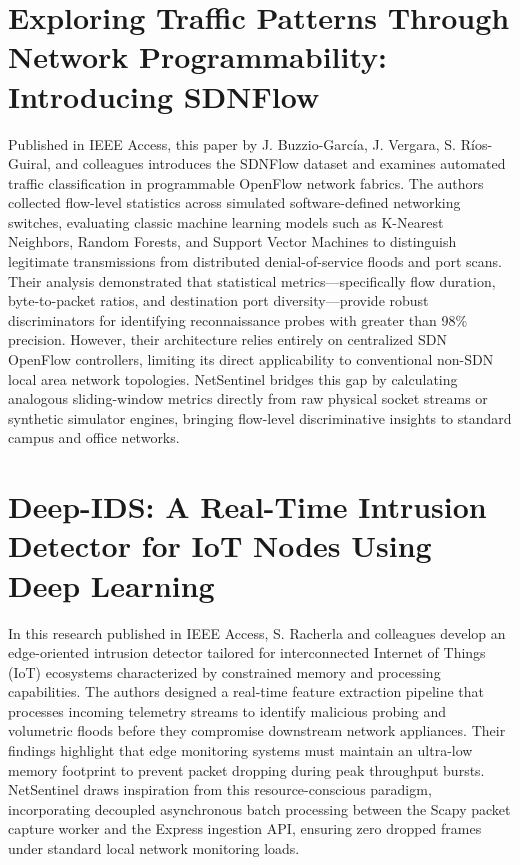 \documentclass[a4paper,12pt]{report}
\begin{document}
	\section{Exploring Traffic Patterns Through Network Programmability: Introducing SDNFlow}
	\par
	Published in IEEE Access, this paper by J. Buzzio-Garc{\'i}a, J. Vergara, S. R{\'i}os-Guiral, and colleagues introduces the SDNFlow dataset and examines automated traffic classification in programmable OpenFlow network fabrics. The authors collected flow-level statistics across simulated software-defined networking switches, evaluating classic machine learning models such as K-Nearest Neighbors, Random Forests, and Support Vector Machines to distinguish legitimate transmissions from distributed denial-of-service floods and port scans. Their analysis demonstrated that statistical metrics—specifically flow duration, byte-to-packet ratios, and destination port diversity—provide robust discriminators for identifying reconnaissance probes with greater than 98\% precision. However, their architecture relies entirely on centralized SDN OpenFlow controllers, limiting its direct applicability to conventional non-SDN local area network topologies. NetSentinel bridges this gap by calculating analogous sliding-window metrics directly from raw physical socket streams or synthetic simulator engines, bringing flow-level discriminative insights to standard campus and office networks.~\cite{four}
	
	\section{Deep-IDS: A Real-Time Intrusion Detector for IoT Nodes Using Deep Learning}
	\par
	In this research published in IEEE Access, S. Racherla and colleagues develop an edge-oriented intrusion detector tailored for interconnected Internet of Things (IoT) ecosystems characterized by constrained memory and processing capabilities. The authors designed a real-time feature extraction pipeline that processes incoming telemetry streams to identify malicious probing and volumetric floods before they compromise downstream network appliances. Their findings highlight that edge monitoring systems must maintain an ultra-low memory footprint to prevent packet dropping during peak throughput bursts. NetSentinel draws inspiration from this resource-conscious paradigm, incorporating decoupled asynchronous batch processing between the Scapy packet capture worker and the Express ingestion API, ensuring zero dropped frames under standard local network monitoring loads.~\cite{five}
	
\end{document}
